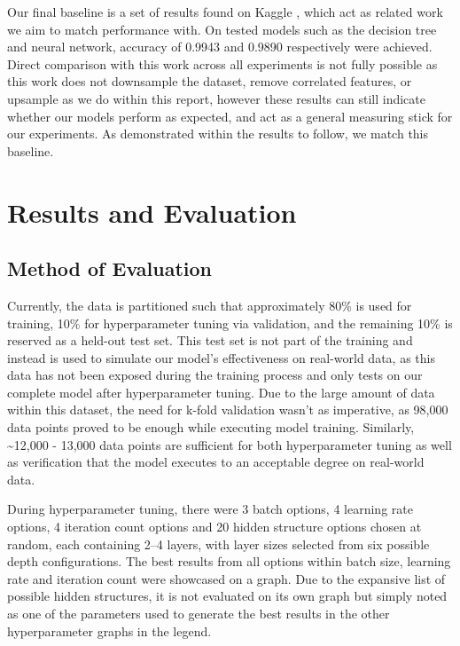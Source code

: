 \documentclass[11pt]{article}
\begin{document}
Our final baseline is a set of results found on Kaggle \citep{ref13}, which act as related work we aim to match performance with. On tested models such as the decision tree and neural network, accuracy of 0.9943 and 0.9890 respectively were achieved. Direct comparison with this work across all experiments is not fully possible as this work does not downsample the dataset, remove correlated features, or upsample as we do within this report, however these results can still indicate whether our models perform as expected, and act as a general measuring stick for our experiments. As demonstrated within the results to follow, we match this baseline.

\section{Results and Evaluation}

\subsection{Method of Evaluation}

Currently, the data is partitioned such that approximately 80\% is used for training, 10\% for hyperparameter tuning via validation, and the remaining 10\% is reserved as a held-out test set. This test set is not part of the training and instead is used to simulate our model's effectiveness on real-world data, as this data has not been exposed during the training process and only tests on our complete model after hyperparameter tuning. Due to the large amount of data within this dataset, the need for k-fold validation wasn't as imperative, as 98,000 data points proved to be enough while executing model training. Similarly, \textasciitilde{}12{,}000 - 13{,}000 data points are sufficient for both hyperparameter tuning as well as verification that the model executes to an acceptable degree on real-world data.

During hyperparameter tuning, there were 3 batch options, 4 learning rate options, 4 iteration count options and 20 hidden structure options chosen at random, each containing 2–4 layers, with layer sizes selected from six possible depth configurations. The best results from all options within batch size, learning rate and iteration count were showcased on a graph. Due to the expansive list of possible hidden structures, it is not evaluated on its own graph but simply noted as one of the parameters used to generate the best results in the other hyperparameter graphs in the legend.
\end{document}
